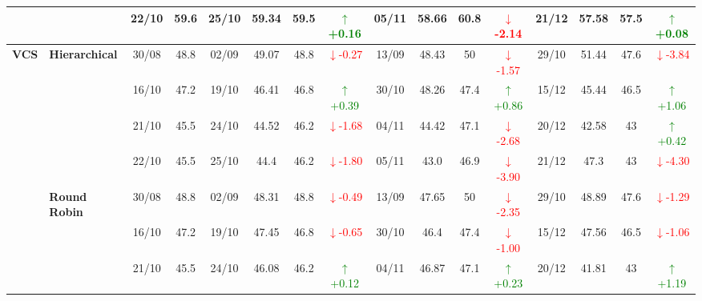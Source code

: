 {\begin{longtable}{llcc|cccc|cccc|cccc}
&
& 22/10 & 59.6 & 25/10 & 59.34 & 59.5 & \textcolor{green}{\(\uparrow\)+0.16} & 05/11 & 58.66 & 60.8 & \textcolor{red}{\(\downarrow\)-2.14} & 21/12 & 57.58 & 57.5 & \textcolor{green}{\(\uparrow\)+0.08} \\
\midrule



\multirow{12}{*}{\textbf{VCS}} 
& \textbf{Hierarchical}
& 30/08 & 48.8 & 02/09 & 49.07 & 48.8 & \textcolor{red}{\(\downarrow\)-0.27} & 13/09 & 48.43 & 50 & \textcolor{red}{\(\downarrow\)-1.57} & 29/10 & 51.44 & 47.6 & \textcolor{red}{\(\downarrow\)-3.84} \\

&
& 16/10 & 47.2 & 19/10 & 46.41 & 46.8 & \textcolor{green}{\(\uparrow\)+0.39} & 30/10 & 48.26 & 47.4 & \textcolor{green}{\(\uparrow\)+0.86} & 15/12 & 45.44 & 46.5 & \textcolor{green}{\(\uparrow\)+1.06} \\

&
& 21/10 & 45.5 & 24/10 & 44.52 & 46.2 & \textcolor{red}{\(\downarrow\)-1.68} & 04/11 & 44.42 & 47.1 & \textcolor{red}{\(\downarrow\)-2.68} & 20/12 & 42.58 & 43 & \textcolor{green}{\(\uparrow\)+0.42} \\

&
& 22/10 & 45.5 & 25/10 & 44.4 & 46.2 & \textcolor{red}{\(\downarrow\)-1.80} & 05/11 & 43.0 & 46.9 & \textcolor{red}{\(\downarrow\)-3.90} & 21/12 & 47.3 & 43 & \textcolor{red}{\(\downarrow\)-4.30} \\
\cmidrule(lr){2-16}


& \textbf{Round Robin}
& 30/08 & 48.8 & 02/09 & 48.31 & 48.8 & \textcolor{red}{\(\downarrow\)-0.49} & 13/09 & 47.65 & 50 & \textcolor{red}{\(\downarrow\)-2.35} & 29/10 & 48.89 & 47.6 & \textcolor{red}{\(\downarrow\)-1.29} \\

&
& 16/10 & 47.2 & 19/10 & 47.45 & 46.8 & \textcolor{red}{\(\downarrow\)-0.65} & 30/10 & 46.4 & 47.4 & \textcolor{red}{\(\downarrow\)-1.00} & 15/12 & 47.56 & 46.5 & \textcolor{red}{\(\downarrow\)-1.06} \\

&
& 21/10 & 45.5 & 24/10 & 46.08 & 46.2 & \textcolor{green}{\(\uparrow\)+0.12} & 04/11 & 46.87 & 47.1 & \textcolor{green}{\(\uparrow\)+0.23} & 20/12 & 41.81 & 43 & \textcolor{green}{\(\uparrow\)+1.19} \\


\end{longtable}}
